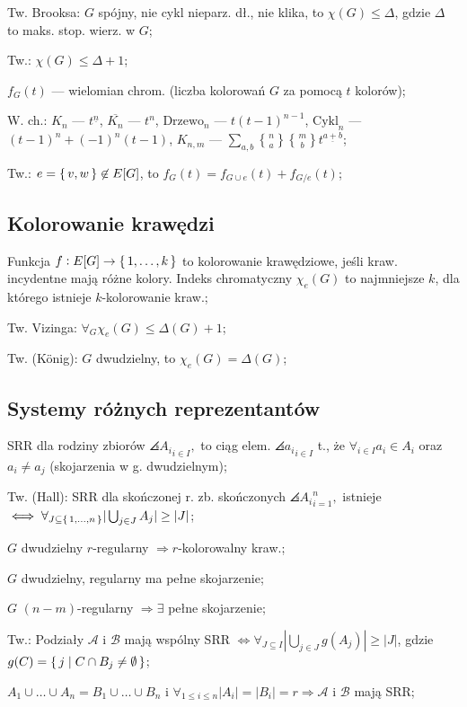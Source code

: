 \entry
Tw. Brooksa: $G$ spójny, nie cykl nieparz. dł., nie klika, to
  $\chi(G) \leq \Delta$, gdzie $\Delta$ to maks. stop. wierz. w $G$;

\entry
Tw.: $\chi(G) \leq \Delta + 1$;

\entry
$f_G(t)$ --- wielomian chrom. (liczba kolorowań $G$ za pomocą $t$ kolorów);

\entry
W. ch.:
\entry
$K_n$ --- $t^{\underline{n}}$,
\entry
$\overline{K_n}$ --- $t^n$,
\entry
$\text{Drzewo}_n$ --- $t(t-1)^{n-1}$,
\entry
$\text{Cykl}_n$ --- $(t-1)^n + (-1)^n(t-1)$,
\entry
$K_{n,m}$ --- $\sum_{a,b}{n \brace a}{m \brace b}t^{\underline{a+b}}$;

\entry
Tw.: $e = \set{v, w} \not\in E[G]$, to $f_G(t)=f_{G\cup e}(t) + f_{G/e}(t)$;

\subsection{Kolorowanie krawędzi}

\entry
Funkcja $f: E[G] \rightarrow \set{1, \dots, k}$ to kolorowanie krawędziowe,
  jeśli kraw. incydentne mają różne kolory. Indeks chromatyczny $\chi_e(G)$ to
  najmniejsze $k$, dla którego istnieje $k$-kolorowanie kraw.;

\entry
Tw. Vizinga: $\forall_G \chi_e(G) \leq \Delta(G) +1$;

\entry
Tw. (K{\"o}nig): $G$ dwudzielny, to $\chi_e(G) = \Delta(G)$;

\subsection{Systemy różnych reprezentantów}

\entry
SRR dla rodziny zbiorów $\angles{A_i}_{i\in I},$ to ciąg elem.
  $\angles{a_i}_{i\in I}$ t., że
  $\forall_{i\in I} a_i \in A_i$ oraz $a_i \neq a_j$
  (skojarzenia w g. dwudzielnym);

\entry
Tw. (Hall): SRR dla skończonej r. zb. skończonych $\angles{A_i}_{i=1}^n,$
  istnieje
  $\iff \forall_{J\subseteq\set{1,\dots,n}} |\bigcup_{j\in J}A_j| \geq |J|$;

\entry
$G$ dwudzielny $r$-regularny $\Rightarrow r$-kolorowalny kraw.;

\entry
$G$ dwudzielny, regularny ma pełne skojarzenie;

\entry
$G$ $(n-m)$-regularny $\Rightarrow \exists$ pełne skojarzenie;

\entry
Tw.: Podziały $\mathcal{A}$ i $\mathcal{B}$ mają wspólny SRR $\Leftrightarrow
  \forall_{J\subseteq I} |\bigcup_{j\in J}g(A_j)| \geq |J|$, gdzie
  $g(C) = \set{j | C \cap B_j \neq \emptyset}$;

\entry
$A_1 \cup \dots \cup A_n = B_1 \cup \dots \cup B_n$ i
  $\forall_{1 \leq i \leq n}|A_i| = |B_i| =r \Rightarrow \mathcal{A}$ i
  $\mathcal{B}$ mają SRR;
